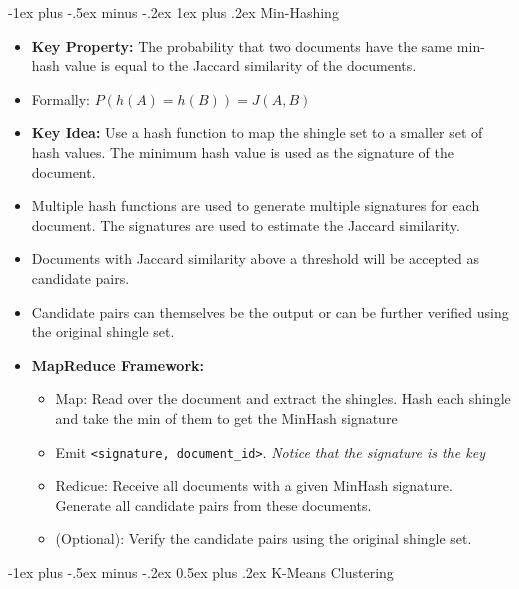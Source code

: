 \documentclass[10pt, landscape]{article}
\makeatletter
\renewcommand{\section}{\@startsection{section}{1}{0mm}%
  {-1ex plus -.5ex minus -.2ex}%
  {0.5ex plus .2ex}%
{\normalfont\large\bfseries}}
\renewcommand{\subsubsection}{\@startsection{subsubsection}{3}{0mm}%
  {-1ex plus -.5ex minus -.2ex}%
  {1ex plus .2ex}%
{\normalfont\small\bfseries}}%
\makeatother
\begin{document}
\begin{multicols*}{4}
  \subsubsection{Min-Hashing}
  \begin{itemize}
    \item \textbf{Key Property:} The probability that two documents have the same min-hash value is equal to the Jaccard similarity of the documents.
    \item Formally: $P(h(A) = h(B)) = J(A, B)$
    \item \textbf{Key Idea:} Use a hash function to map the shingle set to a smaller set of hash values. The minimum hash value is used as the signature of the document.
    \item Multiple hash functions are used to generate multiple signatures for each document. The signatures are used to estimate the Jaccard similarity.
    \item Documents with Jaccard similarity above a threshold will be accepted as candidate pairs.
    \item Candidate pairs can themselves be the output or can be further verified using the original shingle set.
    \item \textbf{MapReduce Framework:}
    \begin{itemize}
      \item Map: Read over the document and extract the shingles. Hash each shingle and take the min of them to get the MinHash signature
      \item Emit \texttt{<signature, document\_id>}. \textit{Notice that the signature is the key}
      \item Redicue: Receive all documents with a given MinHash signature. Generate all candidate pairs from these documents.
      \item (Optional): Verify the candidate pairs using the original shingle set.
    \end{itemize}
  \end{itemize}

  \section{K-Means Clustering}


\end{multicols*}
\end{document}
